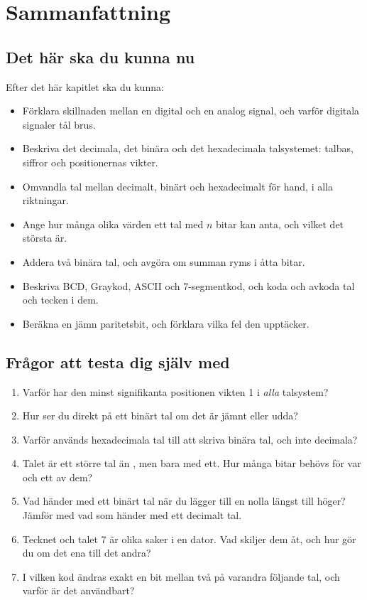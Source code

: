 
\section{Sammanfattning}
\label{c1:sec:summary}

\subsection*{Det här ska du kunna nu}
Efter det här kapitlet ska du kunna:
\begin{itemize}
  \item Förklara skillnaden mellan en digital och en analog signal, och varför digitala signaler
    tål brus.
  \item Beskriva det decimala, det binära och det hexadecimala talsystemet: talbas, siffror och
    positionernas vikter.
  \item Omvandla tal mellan decimalt, binärt och hexadecimalt för hand, i alla riktningar.
  \item Ange hur många olika värden ett tal med $n$ bitar kan anta, och vilket det största är.
  \item Addera två binära tal, och avgöra om summan ryms i åtta bitar.
  \item Beskriva BCD, Graykod, ASCII och 7-segmentkod, och koda och avkoda tal och tecken i dem.
  \item Beräkna en jämn paritetsbit, och förklara vilka fel den upptäcker.
\end{itemize}

\subsection*{Frågor att testa dig själv med}
\begin{enumerate}
  \item Varför har den minst signifikanta positionen vikten 1 i \emph{alla} talsystem?
  \item Hur ser du direkt på ett binärt tal om det är jämnt eller udda?
  \item Varför används hexadecimala tal till att skriva binära tal, och inte decimala?
  \item Talet  är ett större tal än , men bara med ett. Hur många bitar
    behövs för var och ett av dem?
  \item Vad händer med ett binärt tal när du lägger till en nolla längst till höger? Jämför med
    vad som händer med ett decimalt tal.
  \item Tecknet  och talet 7 är olika saker i en dator. Vad skiljer dem åt, och hur gör
    du om det ena till det andra?
  \item I vilken kod ändras exakt en bit mellan två på varandra följande tal, och varför är det
    användbart?
\end{enumerate}

